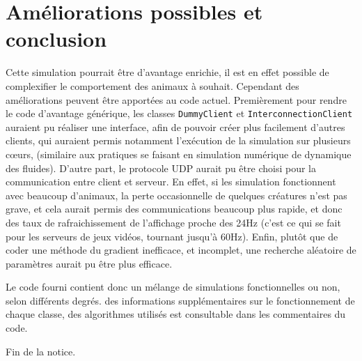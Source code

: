\documentclass[12pt,a4paper,titlepage]{article}
\begin{document}
\section{Améliorations possibles et conclusion}
Cette simulation pourrait être d'avantage enrichie, il est en effet possible de complexifier le comportement des animaux à souhait. Cependant des améliorations peuvent être apportées au code actuel. Premièrement pour rendre le code d'avantage générique, les classes \texttt{DummyClient} et \texttt{InterconnectionClient} auraient pu réaliser une interface, afin de pouvoir créer plus facilement d'autres clients, qui auraient permis notamment l'exécution de la simulation sur plusieurs cœurs, (similaire aux pratiques se faisant en simulation numérique de dynamique des fluides). D'autre part, le protocole UDP aurait pu être choisi pour la communication entre client et serveur. En effet, si les simulation fonctionnent avec beaucoup d'animaux, la perte occasionnelle de quelques créatures n'est pas grave, et cela aurait permis des communications beaucoup plus rapide, et donc des taux de rafraichissement de l'affichage proche des 24Hz (c'est ce qui se fait pour les serveurs de jeux vidéos, tournant jusqu'à 60Hz). Enfin, plutôt que de coder une méthode du gradient inefficace, et incomplet, une recherche aléatoire de paramètres aurait pu être plus efficace.

Le code fourni contient donc un mélange de simulations fonctionnelles ou non, selon différents degrés. des informations supplémentaires sur le fonctionnement de chaque classe, des algorithmes utilisés est consultable dans les commentaires du code. 

\vspace{1cm}
\noindent Fin de la notice.
\end{document}
